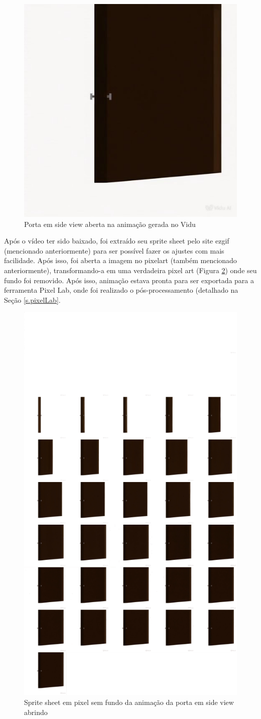 \begin{figure}[htbp]
    \centering
    \caption{\small Porta em side view aberta na animação gerada no Vidu}
    \label{fig:viduPortaFinalAberta}
    \includegraphics[width=0.4\linewidth]{figs/vidu/frameFinal.jpg}
\end{figure}

Após o vídeo ter sido baixado, foi extraído seu sprite sheet pelo site ezgif (mencionado anteriormente) para ser possível fazer os ajustes com mais facilidade. Após isso, foi aberta a imagem no pixelart (também mencionado anteriormente), transformando-a em uma verdadeira pixel art (Figura \ref{fig:viduPortaFinalSpriteSheetPixel}) onde seu fundo foi removido. Após isso, animação estava pronta para ser exportada para a ferramenta Pixel Lab, onde foi realizado o pós-processamento (detalhado na Seção \ref{s.pixelLab}.

\begin{figure}[htbp]
    \centering
    \caption{\small Sprite sheet em pixel sem fundo da animação da porta em side view abrindo}
    \label{fig:viduPortaFinalSpriteSheetPixel}
    \includegraphics[width=0.4\linewidth]{figs/vidu/Pixilart/porta_sprite_sheet_pixel.png}
\end{figure}

